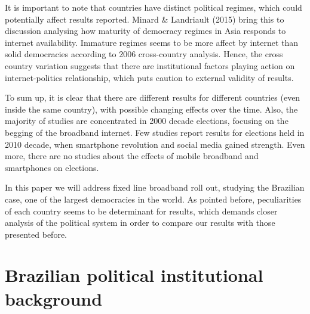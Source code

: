 \documentclass[
  12pt,
]{article}
\begin{document}
It is important to note that countries have distinct political regimes,
which could potentially affect results reported. Minard \& Landriault
(2015) bring this to discussion analysing how maturity of democracy
regimes in Asia responds to internet availability. Immature regimes
seems to be more affect by internet than solid democracies according to
2006 cross-country analysis. Hence, the cross country variation suggests
that there are institutional factors playing action on internet-politics
relationship, which puts caution to external validity of results.

To sum up, it is clear that there are different results for different
countries (even inside the same country), with possible changing effects
over the time. Also, the majority of studies are concentrated in 2000
decade elections, focusing on the begging of the broadband internet. Few
studies report results for elections held in 2010 decade, when
smartphone revolution and social media gained strength. Even more, there
are no studies about the effects of mobile broadband and smartphones on
elections.

In this paper we will address fixed line broadband roll out, studying
the Brazilian case, one of the largest democracies in the world. As
pointed before, peculiarities of each country seems to be determinant
for results, which demands closer analysis of the political system in
order to compare our results with those presented before.

\hypertarget{brazilian-political-institutional-background}{%
\section{Brazilian political institutional
background}\label{brazilian-political-institutional-background}}
\end{document}
